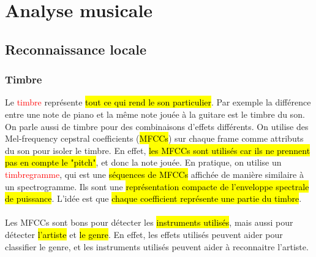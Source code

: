 \documentclass[letterpaper, 12pt]{article}
\newcommand{\alinea}{
\hspace*{0.5cm}}
\newcommand{\red}[1]{
	\textcolor{red}{#1}}
\begin{document}
	\section{Analyse musicale} 
		\subsection{Reconnaissance locale}
			\subsubsection{Timbre}
				\alinea Le \red{timbre} représente \hl{tout ce qui rend le son particulier}. Par exemple la différence entre une note 
					de piano et la même note jouée à la guitare est le timbre du son. On parle aussi de timbre pour des combinaisons 
					d'effets différents. On utilise des Mel-frequency cepstral coefficients (\hl{MFCCs}) sur chaque frame comme attributs 
					du son pour isoler le timbre. En effet, \hl{les MFCCs sont utilisés car ils ne prennent pas en compte le "pitch"}, 
					et donc la note jouée. En pratique, on
					utilise un \red{timbregramme}, qui est une \hl{séquences de MFCCs} affichée de manière similaire à un spectrogramme. 
					Ils sont une \hl{représentation compacte de l'enveloppe spectrale de puissance}. L'idée est que \hl{chaque coefficient 
					représente une partie du timbre}.\\
				~\\
				\alinea Les MFCCs sont bons pour détecter les \hl{instruments utilisés}, mais aussi pour détecter \hl{l'artiste} et 
					\hl{le genre}. En effet, les effets utilisés peuvent aider pour classifier le genre, et les instruments utilisés 
					peuvent aider à reconnaitre l'artiste.
\end{document}
